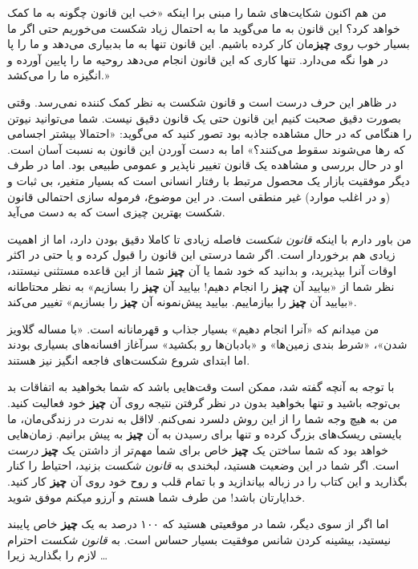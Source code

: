 من هم اکنون شکایت‌های شما را مبنی برا اینکه «خب این قانون چگونه به ما
کمک خواهد کرد؟ این قانون به ما می‌گوید ما به احتمال زیاد شکست می‌خوریم
حتی اگر ما بسیار خوب روی \textbf{چیز}مان کار کرده باشیم. این قانون تنها
به ما بدبیاری می‌دهد و ما را پا در هوا نگه می‌دارد. تنها کاری که این
قانون انجام می‌دهد روحیه ما را پایین آورده و انگیزه ما را می‌کشد.»

در ظاهر این حرف درست است و قانون شکست به نظر کمک کننده نمی‌رسد. وقتی
بصورت دقیق صحبت کنیم این قانون حتی یک قانون دقیق نیست. شما می‌توانید
نیوتن را هنگامی که در حال مشاهده جاذبه بود تصور کنید که می‌گوید:
«احتمالا بیشتر اجسامی که رها می‌شوند سقوط می‌کنند؟» اما به دست آوردن این
قانون به نسبت آسان است. او در حال بررسی و مشاهده یک قانون تغییر ناپذیر و
عمومی طبیعی بود. اما در طرف دیگر موفقیت بازار یک محصول مرتبط با رفتار
انسانی است که بسیار متغیر، بی ثبات و (و در اغلب موارد) غیر منطقی است. در
این موضوع، فرموله سازی احتمالی قانون شکست بهترین چیزی است که به دست
می‌آید.

من باور دارم با اینکه \emph{قانون شکست} فاصله زیادی تا کاملا دقیق بودن
دارد، اما از اهمیت زیادی هم برخوردار است. اگر شما درستی این قانون را
قبول کرده و یا حتی در اکثر اوقات آنرا بپذیرید، و بدانید که خود شما یا آن
\textbf{چیز} شما از این قاعده مستثنی نیستند، نظر شما از «بیایید آن
\textbf{چیز} را انجام دهیم! بیایید آن \textbf{چیز} را بسازیم» به نظر
محتاطانه «بیایید آن \textbf{چیز} را بیازماییم. بیایید پیش‌نمونه آن
\textbf{چیز} را بسازیم» تغییر می‌کند.

من میدانم که «آنرا انجام دهیم» بسیار جذاب و قهرمانانه است. «با مساله
گلاویز شدن»، «شرط بندی زمین‌ها» و «بادبان‌ها رو بکشید» سرآغاز افسانه‌های
بسیاری بودند اما ابتدای شروع شکست‌های فاجعه انگیز نیز هستند.

با توجه به آنچه گفته شد، ممکن است وقت‌هایی باشد که شما بخواهید به
اتفاقات بد بی‌توجه باشید و تنها بخواهید بدون در نظر گرفتن نتیجه روی آن
\textbf{چیز} خود فعالیت کنید. من به هیچ وجه شما را از این روش دلسرد
نمی‌کنم. لااقل به ندرت در زندگی‌مان، ما بایستی ریسک‌های بزرگ کرده و تنها
برای رسیدن به آن \textbf{چیز} به پیش برانیم. زمان‌هایی خواهد بود که شما
ساختن یک \textbf{چیز} خاص برای شما مهم‌تر از داشتن یک \textbf{چیز}
\emph{درست} است. اگر شما در این وضعیت هستید، لبخندی به \emph{قانون شکست}
بزنید، احتیاط را کنار بگذارید و این کتاب را در زباله بیاندازید و با تمام
قلب و روح خود روی آن \textbf{چیز} کار کنید. خدایارتان باشد! من طرف شما
هستم و آرزو میکنم موفق شوید.

اما اگر از سوی دیگر، شما در موقعیتی هستید که ۱۰۰ درصد به یک \textbf{چیز}
خاص پایبند نیستید، بیشینه کردن شانس موفقیت بسیار حساس است. به
\emph{قانون شکست} احترام لازم را بگذارید زیرا \ldots{}

